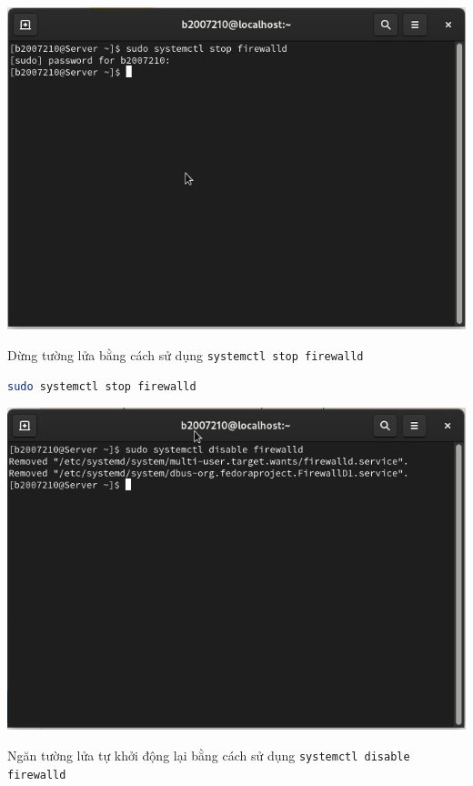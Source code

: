 \documentclass[a4paper, 11pt]{article}
\begin{document}
\begin{itemize}
          \begin{minipage}
              {\linewidth}
              \captionsetup{type=figure}
              \centering
              \includegraphics[width=\linewidth]{images/stop-firewalld.png}
              \caption{Dừng tường lửa bằng cách sử dụng \texttt{systemctl stop firewalld}}
              \label{figure:stop-firewalld}
          \end{minipage}

          \begin{lstlisting}[language=bash, caption=Dừng tường lửa]
sudo systemctl stop firewalld
\end{lstlisting}

          \begin{minipage}
              {\linewidth}
              \captionsetup{type=figure}
              \centering
              \includegraphics[width=\linewidth]{images/disable-firewalld.png}
              \caption{Ngăn tường lửa tự khởi động lại bằng cách sử dụng \texttt{systemctl disable firewalld}}
              \label{figure:disable-firewalld}
          \end{minipage}


\end{itemize}
\end{document}
